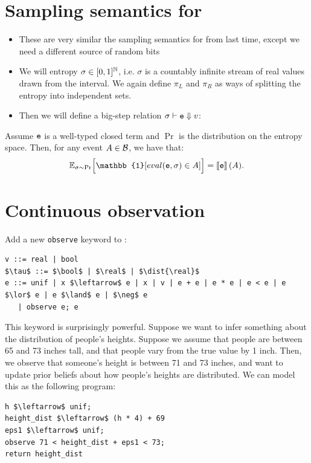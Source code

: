 \documentclass{tufte-handout}
\begin{document}
\section{Sampling semantics for \cont{}}
\begin{itemize}
  \item These are very similar the sampling semantics for \disc{} from last time,
  except we need a different source of random bits 
  \item We will entropy $\sigma \in [0,1]^{\mathbb{N}}$, i.e. $\sigma$ is a countably infinite
  stream of real values drawn from the interval. We again define $\pi_L$ and $\pi_R$ 
  as ways of splitting the entropy into independent sets.
  \item Then we will define a big-step relation $\sigma \vdash \texttt{e} \Downarrow v$:
\end{itemize}

\begin{theorem}
  Assume $\texttt{e}$ is a well-typed closed term and $\Pr$ is the 
  distribution on the entropy space. Then, for any 
  event $A \in \mathcal{B}$, we have that: 
  \begin{align} 
    \E_{\sigma \sim \Pr} \Big[\mathbb{1}[eval(\te, \sigma) \in A] \Big] = 
    \dbracket{\te}(A).
  \end{align}
\end{theorem}

\section{Continuous observation}

Add a new \texttt{observe} keyword to \cont{}:

\begin{lstlisting}[mathescape = true]
v ::= real | bool
$\tau$ ::= $\bool$ | $\real$ | $\dist{\real}$
e ::= unif | x $\leftarrow$ e | x | v | e + e | e * e | e < e | e $\lor$ e | e $\land$ e | $\neg$ e 
   | observe e; e
\end{lstlisting}

This keyword is surprisingly powerful. Suppose we want to infer something 
about the distribution of people's heights. Suppose we assume that people 
are between 65 and 73 inches tall, and that people 
vary from the true value by 1 inch.
Then, we observe that someone's height 
is between 71 and 73 inches, 
and want to update prior beliefs about how people's heights are distributed.
We can model this as the following program:

\begin{lstlisting}[mathescape=true]
h $\leftarrow$ unif;
height_dist $\leftarrow$ (h * 4) + 69
eps1 $\leftarrow$ unif;
observe 71 < height_dist + eps1 < 73;
return height_dist
\end{lstlisting}



\end{document}
